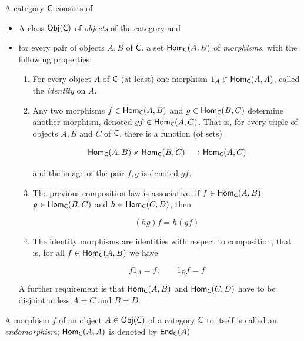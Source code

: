 \documentclass{article}
\begin{document}
\begin{definition}
  A category \(\mathsf{C}\) consists of 
  \begin{itemize}

    \item A class \(\mathsf{Obj}(\mathsf{C})\) of \emph{objects} of the category and

    \item for every pair of objects \(A,B\) of \(\mathsf{C}\), a set \(\mathsf{Hom}_{\mathsf{C}}(A,B)\)
      of \emph{morphisms}, with the following properties: 

      \begin{enumerate}

        \item For every object \(A\) of \(\mathsf{C}\) (at least) one morphism
          \(1_{A}\in \mathsf{Hom}_{\mathsf{C}}(A, A)\), called the \emph{identity} on \(A\).

        \item Any two morphisms \(f\in \mathsf{Hom}_{\mathsf{C}}(A,B)\) and 
          \(g\in \mathsf{Hom}_{\mathsf{C}}(B,C)\) determine another morphism, denoted 
          \(gf\in \mathsf{Hom}_{\mathsf{C}}(A,C)\). That is, for every triple of objects \(A,B\) and 
          \(C\) of \(\mathsf{C}\), there is a function (of sets)

          \[
            \mathsf{Hom}_{\mathsf{C}}(A,B) \times \mathsf{Hom}_{\mathsf{C}}(B,C) \longrightarrow \mathsf{Hom}_{\mathsf{C}}(A, C)
          \]

          and the image of the pair \(f,g\) is denoted \(gf\).

        \item The previous composition law is associative: if \(f\in \mathsf{Hom}_{\mathsf{C}}(A,B)\), 
          \(g\in \mathsf{Hom}_{\mathsf{C}}(B,C)\) and \(h\in \mathsf{Hom}_{\mathsf{C}}(C, D)\), then 

          \[
            (hg)f = h(gf)
          \]

        \item The identity morphisms are identities with respect to composition, that is,
          for all \(f\in \mathsf{Hom}_{\mathsf{C}}(A,B)\) we have 

          \[
            f1_{A} = f, \qquad 1_{B}f = f
          \]

      \end{enumerate}

      A further requirement is that \(\mathsf{Hom}_{\mathsf{C}}(A,B)\) and \(\mathsf{Hom}_{\mathsf{C}}(C,D)\) 
      have to be disjoint unless \(A = C\) and \(B = D\).
  \end{itemize}
  
\end{definition}

\begin{notation}[Endomorphism]
  A morphism \(f\) of an object \(A\in \mathsf{Obj}(\mathsf{C})\) of a category \(\mathsf{C}\) to itself is 
  called an \emph{endomorphism}; \(\mathsf{Hom}_{\mathsf{C}}(A,A)\) is denoted by \(\mathsf{End}_{\mathsf{C}}(A)\)
\end{notation}



\printbibliography
\end{document}
